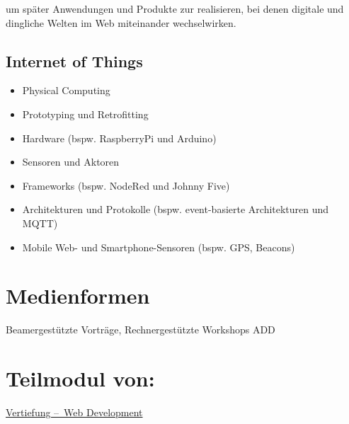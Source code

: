 um später Anwendungen und Produkte zur realisieren, bei denen digitale
und dingliche Welten im Web miteinander wechselwirken.

\hypertarget{internet-of-thingspathlabelmi-2017modulbeschreibungen-bachelorba_wd_internet-of-things-1}{%
\subsection*{Internet of
Things\label{/mi-2017/modulbeschreibungen-bachelor/BA_WD_Internet-of-things}}\label{internet-of-thingspathlabelmi-2017modulbeschreibungen-bachelorba_wd_internet-of-things-1}}

\begin{itemize}
\tightlist
\item
  Physical Computing
\item
  Prototyping und Retrofitting
\item
  Hardware (bspw. RaspberryPi und Arduino)
\item
  Sensoren und Aktoren
\item
  Frameworks (bspw. NodeRed und Johnny Five)
\item
  Architekturen und Protokolle (bspw. event-basierte Architekturen und
  MQTT)
\item
  Mobile Web- und Smartphone-Sensoren (bspw. GPS, Beacons)
\end{itemize}

\hypertarget{medienformenpathlabelmi-2017modulbeschreibungen-bachelorba_wd_internet-of-things}{%
\section*{Medienformen\label{/mi-2017/modulbeschreibungen-bachelor/BA_WD_Internet-of-things}}\label{medienformenpathlabelmi-2017modulbeschreibungen-bachelorba_wd_internet-of-things}}

Beamergestützte Vorträge, Rechnergestützte Workshops ADD

\hypertarget{teilmodul-vonpathlabelmi-2017modulbeschreibungen-bachelorba_wd_internet-of-things}{%
\section*{Teilmodul
von:\label{/mi-2017/modulbeschreibungen-bachelor/BA_WD_Internet-of-things}}\label{teilmodul-vonpathlabelmi-2017modulbeschreibungen-bachelorba_wd_internet-of-things}}

\hyperref[/mi-2017/modulbeschreibungen-bachelor/BA_Vertiefung-Web_Development]{Vertiefung – Web Development}

